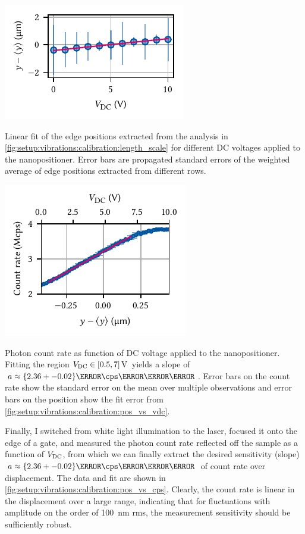 \begin{marginfigure}
    \centering
    \includegraphics{img/pdf/setup/knife_edge_fits}
    \caption[]{
        Linear fit of the edge positions extracted from the analysis in \cref{fig:setup:vibrations:calibration:length_scale} for different DC voltages applied to the nanopositioner.
        Error bars are propagated standard errors of the weighted average of edge positions extracted from different rows.
    }
    \label{fig:setup:vibrations:calibration:pos_vs_vdc}
\end{marginfigure}
\begin{marginfigure}
    \centering
    \includegraphics{img/pdf/setup/knife_edge_slope}
    \caption[]{
        Photon count rate as function of DC voltage applied to the nanopositioner.
        Fitting the region $V_{\mr{DC}}\in[0.5, 7]\,\unit{\volt}$ yields a slope of $a\approx\qty{2.36+-0.02}{\mega\cps\per\micro\meter}$.
        Error bars on the count rate show the standard error on the mean over multiple observations and error bars on the position show the fit error from \cref{fig:setup:vibrations:calibration:pos_vs_vdc}.
    }
    \label{fig:setup:vibrations:calibration:pos_vs_cps}
\end{marginfigure}

Finally, I switched from white light illumination to the laser, focused it onto the edge of a gate, and measured the photon count rate reflected off the sample as a function of $V_{\mathrm{DC}}$, from which we can finally extract the desired sensitivity (slope) $a\approx\qty{2.36+-0.02}{\mega\cps\per\micro\meter}$ of count rate over displacement.
The data and fit are shown in \cref{fig:setup:vibrations:calibration:pos_vs_cps}.
Clearly, the count rate is linear in the displacement over a large range, indicating that for fluctuations with amplitude on the order of \qty{100}{\nano\meter} \gls{rms}, the measurement sensitivity should be sufficiently robust.

